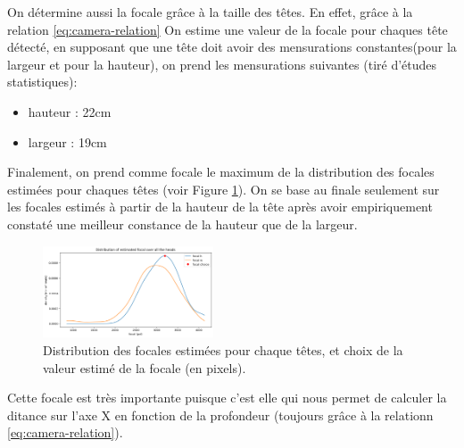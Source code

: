 

On détermine aussi la focale grâce à la taille des têtes. En effet, grâce à la relation \ref{eq:camera-relation} On estime une valeur de la focale pour chaques tête détecté, en supposant que une tête doit avoir des mensurations constantes(pour la largeur et pour la hauteur), on prend les mensurations suivantes (tiré d'études statistiques):

\begin{itemize}
    \item hauteur : 22cm
    \item largeur : 19cm
\end{itemize}

Finalement, on prend comme focale le maximum de la distribution des focales estimées pour chaques têtes (voir Figure \ref{fig:focal-estimation}). On se base au finale seulement sur les focales estimés à partir de la hauteur de la tête après avoir empiriquement constaté une meilleur constance de la hauteur que de la largeur.

\begin{figure}[h!]
    \centering
    \includegraphics[width=0.45\textwidth]{images/focal_choice.png}
    \caption{Distribution des focales estimées pour chaque têtes, et choix de la valeur estimé de la focale (en pixels).}
    \label{fig:focal-estimation}
\end{figure}

Cette focale est très importante puisque c'est elle qui nous permet de calculer la ditance sur l'axe X en fonction de la profondeur (toujours grâce à la relationn \ref{eq:camera-relation}).